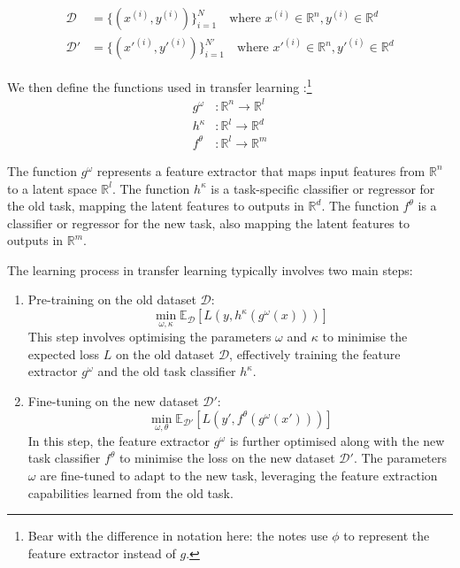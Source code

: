 \begin{align}
    \mathcal{D} &= \{(x^{(i)}, y^{(i)})\}_{i=1}^N \quad \text{where } x^{(i)} \in \mathbb{R}^n, y^{(i)} \in \mathbb{R}^d \\
    \mathcal{D}' &= \{(x'^{(i)}, y'^{(i)})\}_{i=1}^{N'} \quad \text{where } x'^{(i)} \in \mathbb{R}^n, y'^{(i)} \in \mathbb{R}^d
\end{align}

We then define the functions used in transfer learning :\footnote[][]{Bear with the difference in notation here: the notes use $\phi$ to represent the feature extractor instead of $g$.}
\begin{align}
    g^\omega &: \mathbb{R}^n \rightarrow \mathbb{R}^l \\
    h^\kappa &: \mathbb{R}^l \rightarrow \mathbb{R}^d \\ 
    f^\theta &: \mathbb{R}^l \rightarrow \mathbb{R}^m
\end{align}

The function $g^\omega$ represents a feature extractor that maps input features from $\mathbb{R}^n$ to a latent space $\mathbb{R}^l$. The function $h^\kappa$ is a task-specific classifier or regressor for the old task, mapping the latent features to outputs in $\mathbb{R}^d$. The function $f^\theta$ is a classifier or regressor for the new task, also mapping the latent features to outputs in $\mathbb{R}^m$. \bigskip

The learning process in transfer learning typically involves two main steps:

\begin{enumerate}
    \item Pre-training on the old dataset $\mathcal{D}$:
   \begin{equation}
   \min_{\omega, \kappa} \mathbb{E}_{\mathcal{D}}[L(y, h^\kappa(g^\omega(x)))]
   \end{equation}
   This step involves optimising the parameters $\omega$ and $\kappa$ to minimise the expected loss $L$ on the old dataset $\mathcal{D}$, effectively training the feature extractor $g^\omega$ and the old task classifier $h^\kappa$.

    \item Fine-tuning on the new dataset $\mathcal{D}'$:
   \begin{equation}
   \min_{\omega, \theta} \mathbb{E}_{\mathcal{D}'}[L(y', f^\theta(g^\omega(x')))]
   \end{equation}
   In this step, the feature extractor $g^\omega$ is further optimised along with the new task classifier $f^\theta$ to minimise the loss on the new dataset $\mathcal{D}'$. The parameters $\omega$ are fine-tuned to adapt to the new task, leveraging the feature extraction capabilities learned from the old task.

\end{enumerate}

